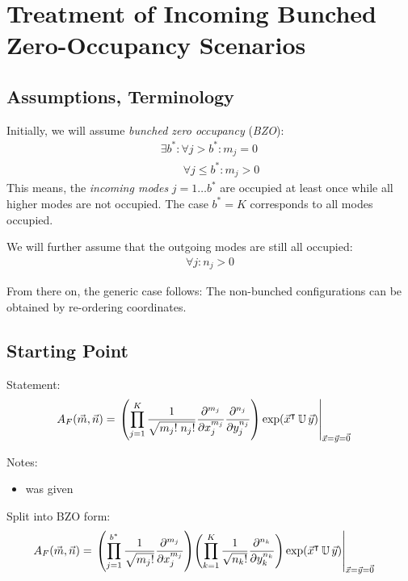 \documentclass[
	english,
	a4paper,
	fontsize=10pt,
	parskip=half,
	titlepage=true,
	DIV=12,
	final
]{scrreprt}
\title{\myTitle}
\author{\myName}
\date{\today}
\newcommand*{\transp}{\ensuremath{^\intercal}}
\begin{document}
\tableofcontents
\newpage

\chapter{Treatment of Incoming Bunched Zero-Occupancy Scenarios}
\section{Assumptions, Terminology}
Initially, we will assume \emph{bunched zero occupancy} (\emph{BZO}):
\begin{align}
	\exists b^{*} : \forall j > b^{*} : m_j = 0 \\
	\qquad \forall j \leq b^* : m_j > 0
\end{align}
This means, the \emph{incoming modes} $j = 1 \ldots b^{*}$ are occupied at least once while all higher modes are not occupied. The case $b^* = K$ corresponds to all modes occupied.

We will further assume that the outgoing modes are still all occupied:
\begin{align}
	\forall j : n_j > 0
\end{align}

From there on, the generic case follows: The non-bunched configurations can be obtained by re-ordering coordinates.

\section{Starting Point}
Statement:
\begin{align}
	A_F(\vec{m}, \vec{n})
&=
	\eval{\qty(
			\prod_{j=1}^{K}
			\frac
				{1}
				{\sqrt{m_j! \; n_j!}}
			\pdv[m_j]{x_j}
			\pdv[n_j]{y_j}
		) \exp(\vec{x}\transp \, \mathbb{U} \, \vec{y})
	}_{\vec{x} = \vec{y} = \vec{0}}
\label{eqn:BSA_raw}
\end{align}

Notes:
\begin{itemize}
\item was given
\end{itemize}

Split into BZO form:
\begin{align}
	A_F(\vec{m}, \vec{n})
&=
	\eval{
		\qty(
			\prod_{j=1}^{b^*}
			\frac {1} {\sqrt{m_j!}}
			\pdv[m_j]{x_j}
		)
		\qty(
			\prod_{k=1}^{K}
			\frac
				{1}
				{\sqrt{n_k!}}
			\pdv[n_k]{y_k}
		)
		\exp(\vec{x}\transp \, \mathbb{U} \, \vec{y})
	}_{\vec{x} = \vec{y} = \vec{0}}
\label{eqn:BSA_raw_BZO_m}
\end{align}
\end{document}
